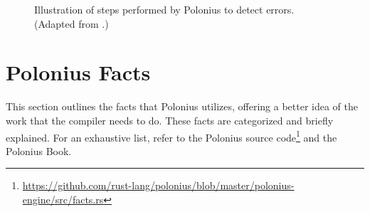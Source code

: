 \documentclass[
  11pt,
  twoside,symmetric]{report}
\DeclareRobustCommand{\href}[2]{#2\footnote{\url{#1}}}
\begin{document}
\begin{figure}
\centering

\caption{Illustration of steps performed by Polonius to detect errors.
(Adapted from .)}
\end{figure}

\section{Polonius Facts}\label{sec:polonius-facts}

This section outlines the facts that Polonius utilizes, offering a
better idea of the work that the compiler needs to do. These facts are
categorized and briefly explained. For an exhaustive list, refer to the
\href{https://github.com/rust-lang/polonius/blob/master/polonius-engine/src/facts.rs}{Polonius
source code} and the Polonius Book.
\end{document}
